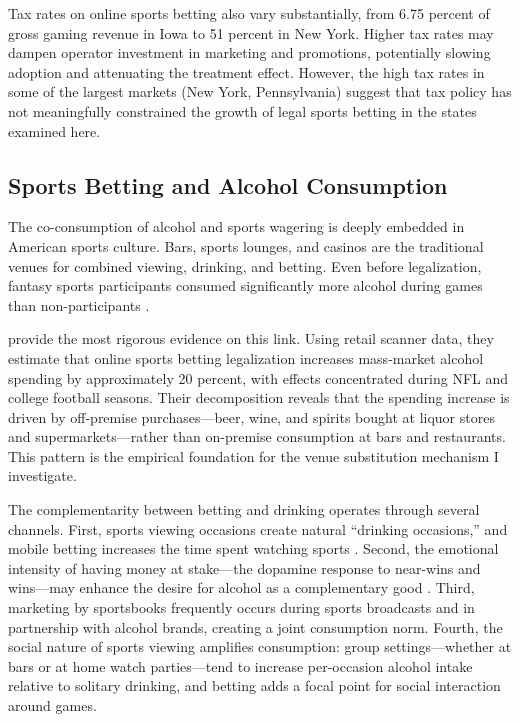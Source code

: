 \documentclass[12pt]{article}
\begin{document}
Tax rates on online sports betting also vary substantially, from 6.75 percent of gross gaming revenue in Iowa to 51 percent in New York. Higher tax rates may dampen operator investment in marketing and promotions, potentially slowing adoption and attenuating the treatment effect. However, the high tax rates in some of the largest markets (New York, Pennsylvania) suggest that tax policy has not meaningfully constrained the growth of legal sports betting in the states examined here.

\subsection{Sports Betting and Alcohol Consumption}

The co-consumption of alcohol and sports wagering is deeply embedded in American sports culture. Bars, sports lounges, and casinos are the traditional venues for combined viewing, drinking, and betting. Even before legalization, fantasy sports participants consumed significantly more alcohol during games than non-participants \citep{humphreys2010participation}.

\citet{taylor2024betting} provide the most rigorous evidence on this link. Using retail scanner data, they estimate that online sports betting legalization increases mass-market alcohol spending by approximately 20 percent, with effects concentrated during NFL and college football seasons. Their decomposition reveals that the spending increase is driven by off-premise purchases---beer, wine, and spirits bought at liquor stores and supermarkets---rather than on-premise consumption at bars and restaurants. This pattern is the empirical foundation for the venue substitution mechanism I investigate.

The complementarity between betting and drinking operates through several channels. First, sports viewing occasions create natural ``drinking occasions,'' and mobile betting increases the time spent watching sports \citep{freedman2024uber}. Second, the emotional intensity of having money at stake---the dopamine response to near-wins and wins---may enhance the desire for alcohol as a complementary good \citep{conlisk1993utility}. Third, marketing by sportsbooks frequently occurs during sports broadcasts and in partnership with alcohol brands, creating a joint consumption norm. Fourth, the social nature of sports viewing amplifies consumption: group settings---whether at bars or at home watch parties---tend to increase per-occasion alcohol intake relative to solitary drinking, and betting adds a focal point for social interaction around games.
\end{document}
